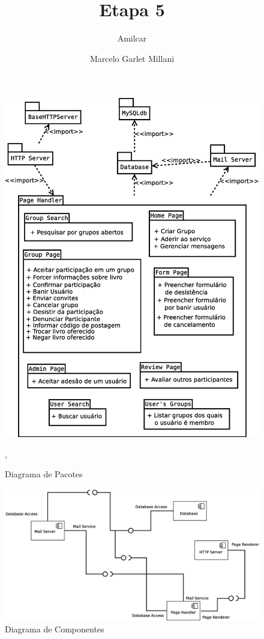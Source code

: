 \documentclass[a4paper]{article}
\title{Etapa 5}
\author{Amilcar \and Marcelo Garlet Millani}
\date{}
\begin{document}
 \maketitle 
 
 \begin{figure}[H]
  \includegraphics[totalheight=\textheight]{pacotes.eps}
  \caption{Diagrama de Pacotes},
 \end{figure}
 
 \begin{figure}[H]
  \includegraphics[angle=90,totalheight=\textheight]{componentes.eps}
  \caption{Diagrama de Componentes}
 \end{figure}
 
\end{document}
